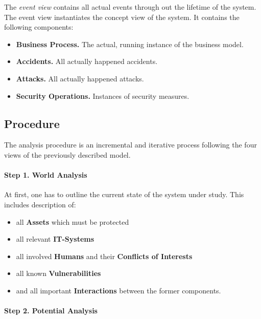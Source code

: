 \documentclass[runningheads,a4paper]{llncs}
\newenvironment{LGContent}
{ \par\color{blue} \it \small }
{ \par }
\begin{document}
\begin{LGContent}


The \emph{event view} contains all actual events through out the lifetime of the system.
The event view instantiates the concept view of the system.
It contains the following components:
\begin{itemize}
\item \textbf{Business Process.}
The actual, running instance of the business model.

\item \textbf{Accidents.}
All actually happened accidents.

\item \textbf{Attacks.}
All actually happened attacks.

\item \textbf{Security Operations.}
Instances of security measures.
\end{itemize}


\subsection{Procedure}

The analysis procedure is an incremental and iterative process following the four views of the previously described model.



\paragraph*{Step 1. World Analysis}

At first, one has to outline the current state of the system under study. This includes description of:
\begin{itemize}
\item all \textbf{Assets} which must be protected
\item all relevant \textbf{IT-Systems}
\item all involved \textbf{Humans} and their \textbf{Conflicts of Interests}
\item all known \textbf{Vulnerabilities}
\item and all important \textbf{Interactions} between the former components.
\end{itemize}

\paragraph*{Step 2. Potential Analysis}


\end{LGContent}
\end{document}
